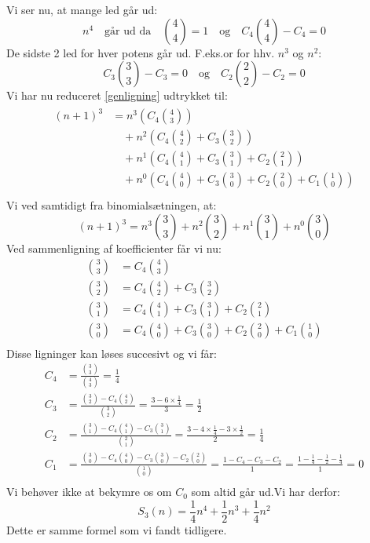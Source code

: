 Vi ser nu, at mange led går ud:
\[n^4 \quad \text{går ud da} \quad \binom{4}{4}=1 \quad \text{og} \quad C_4\binom{4}{4}-C_4=0\]
De sidste 2 led for hver potens går ud. F.eks.or for hhv. \(n^3\) og \(n^2\):
\[C_3\binom{3}{3}-C_3=0 \quad \text{og} \quad C_2\binom{2}{2}-C_2=0\] 
Vi har nu reduceret \ref{genligning} udtrykket til:
\begin{align}
\begin{split}
(n+1)^3&=n^3\left(C_4\binom{4}{3}\right)\\
&\quad+n^2\left(C_4\binom{4}{2}+C_3\binom{3}{2}\right)\\
&\quad+n^1\left(C_4\binom{4}{1}+C_3\binom{3}{1}+C_2\binom{2}{1}\right)\\
&\quad+n^0\left(C_4\binom{4}{0}+C_3\binom{3}{0}+C_2\binom{2}{0}+C_1\binom{1}{0}\right)\\
\end{split}
\end{align}
Vi ved samtidigt fra binomialsætningen, at:
\[(n+1)^3=n^3\binom{3}{3}+n^2\binom{3}{2}+n^1\binom{3}{1}+n^0\binom{3}{0}\]
Ved sammenligning af koefficienter får vi nu:
\begin{align*}
\binom{3}{3}&=C_4\binom{4}{3}\tag{Koeff:\;\(n^3\)}\\
\binom{3}{2}&=C_4\binom{4}{2}+C_3\binom{3}{2}\tag{Koeff:\;\(n^2\)}\\
\binom{3}{1}&=C_4\binom{4}{1}+C_3\binom{3}{1}+C_2\binom{2}{1}\tag{Koeff:\;\(n^1\)}\\
\binom{3}{0}&=C_4\binom{4}{0}+C_3\binom{3}{0}+C_2\binom{2}{0}+C_1\binom{1}{0}\tag{Koeff:\;\(n^0\)}\\
\end{align*}
Disse ligninger kan løses succesivt og vi får:
\begin{align*}
C_4&=\frac{\binom{3}{3}}{\binom{4}{3}}=\frac{1}{4}\\
C_3&=\frac{\binom{3}{2}-C_4\binom{4}{2}}{\binom{3}{2}}=\frac{3-6 \times \frac{1}{4}}{3}=\frac{1}{2}\\
C_2&=\frac{\binom{3}{1}-C_4\binom{4}{1}-C_3\binom{3}{1}}{\binom{2}{1}}=\frac{3-4 \times \frac{1}{4}-3 \times \frac{1}{2}}{2}=\frac{1}{4}\\
C_1&=\frac{\binom{3}{0}-C_4\binom{4}{0}-C_3\binom{3}{0}-C_2\binom{2}{0}}{\binom{1}{0}}=\frac{1-C_4-C_3-C_2}{1}=\frac{1-\frac{1}{4}-\frac{1}{2}-\frac{1}{4}}{1}=0\\
\end{align*}
Vi behøver ikke at bekymre os om \(C_0\) som altid går ud.Vi har derfor:
\[S_3(n)=\frac{1}{4}n^4+\frac{1}{2}n^3+\frac{1}{4}n^2\]
Dette er samme formel som vi fandt tidligere.

